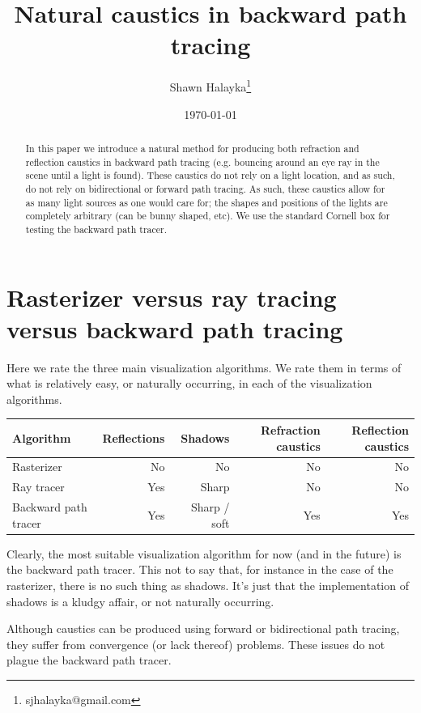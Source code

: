 \documentclass[12pt]{article}
\title{Natural caustics in backward path tracing}
\author{
Shawn Halayka\footnote{sjhalayka@gmail.com}
}
\date{\today\;\currenttime}
\begin{document}
\newcommand{\abs}[1]{\lvert#1\rvert}



\maketitle




\begin{abstract}
In this paper we introduce a natural method for producing both refraction and reflection caustics in backward path tracing (e.g. bouncing around an eye ray in the scene until a light is found).
These caustics do not rely on a light location, and as such, do not rely on bidirectional or forward path tracing.
As such, these caustics allow for as many light sources as one would care for; the shapes and positions of the lights are completely arbitrary (can be bunny shaped, etc).
We use the standard Cornell box for testing the backward path tracer.
\end{abstract}

\section{Rasterizer versus ray tracing versus backward path tracing}

Here we rate the three main visualization algorithms.
We rate them in terms of what is relatively easy, or naturally occurring, in each of the visualization algorithms.
\begin{center}
\begin{tabular}{| l | r | r | r | r |}
  \hline
 Algorithm &  Reflections & Shadows & Refraction caustics & Reflection caustics \\
\hline
\hline
Rasterizer & No & No & No &  No \\
Ray tracer & Yes & Sharp & No & No  \\
Backward path tracer & Yes & Sharp / soft & Yes & Yes \\
  \hline  
\end{tabular}
\end{center}
Clearly, the most suitable visualization algorithm for now (and in the future) is the backward path tracer.
This not to say that, for instance in the case of the rasterizer, there is no such thing as shadows.
It's just that the implementation of shadows is a kludgy affair, or not naturally occurring.

Although caustics can be produced using forward or bidirectional path tracing, they suffer from convergence (or lack thereof) problems.
These issues do not plague the backward path tracer.
\end{document}
